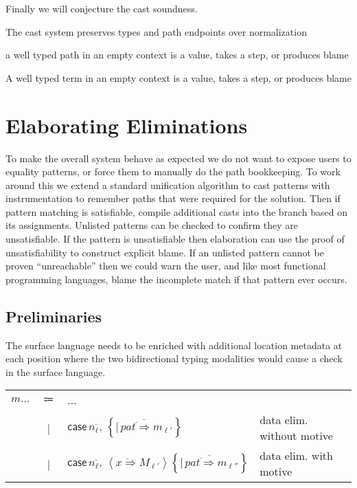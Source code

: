 
Finally we will conjecture the cast soundness.
\begin{conjecture}
The cast system preserves types and path endpoints over normalization
\end{conjecture}

\begin{conjecture}
a well typed path in an empty context is a value, takes a step, or
produces blame
\end{conjecture}

\begin{conjecture}
A well typed term in an empty context is a value, takes a step, or
produces blame
\end{conjecture}


\section{Elaborating Eliminations}



To make the overall system behave as expected we do not want to expose
users to equality patterns, or force them to manually do the path
bookkeeping. To work around this we extend a standard unification
algorithm to cast patterns with instrumentation to remember paths
that were required for the solution. Then if pattern matching is satisfiable,
compile additional casts into the branch based on its assignments.
Unlisted patterns can be checked to confirm they are unsatisfiable.
If the pattern is unsatisfiable then elaboration can use the proof
of unsatisfiability to construct explicit blame. If an unlisted pattern
cannot be proven ``unreachable'' then we could warn the user, and
like most functional programming languages, blame the incomplete match
if that pattern ever occurs.

\subsection{Preliminaries}

The surface language needs to be enriched with additional location
metadata at each position where the two bidirectional typing modalities
would cause a check in the surface language.

\begin{tabular}{lcll}
$m...$ & $\Coloneqq$ & ... & \tabularnewline
 & | & $\mathsf{case}\,\overline{n_{\ell},}\,\left\{ \overline{|\,\overline{pat\Rightarrow}m_{\ell'}}\right\} $ & data elim. without motive\tabularnewline
 & | & $\mathsf{case}\,\overline{n_{\ell},}\,\left\langle \overline{x\Rightarrow}M_{\ell'}\right\rangle \left\{ \overline{|\,\overline{pat\Rightarrow}m_{\ell''}}\right\} $ & data elim. with motive\tabularnewline
\end{tabular}

